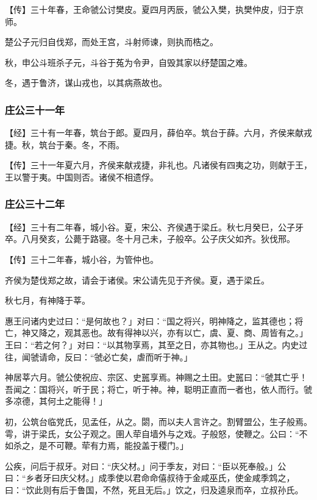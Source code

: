 \documentclass[]{article}
\begin{document}
【传】三十年春，王命虢公讨樊皮。夏四月丙辰，虢公入樊，执樊仲皮，归于京师。

楚公子元归自伐郑，而处王宫，斗射师谏，则执而梏之。

秋，申公斗班杀子元，斗谷于菟为令尹，自毁其家以纾楚国之难。

冬，遇于鲁济，谋山戎也，以其病燕故也。

\hypertarget{header-n594}{%
\subsubsection{庄公三十一年}\label{header-n594}}

【经】三十有一年春，筑台于郎。夏四月，薛伯卒。筑台于薛。六月，齐侯来献戎捷。秋，筑台于秦。冬，不雨。

【传】三十一年夏六月，齐侯来献戎捷，非礼也。凡诸侯有四夷之功，则献于王，王以警于夷。中国则否。诸侯不相遗俘。

\hypertarget{header-n599}{%
\subsubsection{庄公三十二年}\label{header-n599}}

【经】三十有二年春，城小谷。夏，宋公、齐侯遇于梁丘。秋七月癸巳，公子牙卒。八月癸亥，公薨于路寝。冬十月己未，子般卒。公子庆父如齐。狄伐邢。

【传】三十二年春，城小谷，为管仲也。

齐侯为楚伐郑之故，请会于诸侯。宋公请先见于齐侯。夏，遇于梁丘。

秋七月，有神降于莘。

惠王问诸内史过曰：``是何故也？」对曰：``国之将兴，明神降之，监其德也；将亡，神又降之，观其恶也。故有得神以兴，亦有以亡，虞、夏、商、周皆有之。」王曰：``若之何？」对曰：``以其物享焉，其至之日，亦其物也。」王从之。内史过往，闻虢请命，反曰：``虢必亡矣，虐而听于神。」

神居莘六月。虢公使祝应、宗区、史嚚享焉。神赐之土田。史嚚曰：``虢其亡乎！吾闻之：国将兴，听于民；将亡，听于神。神，聪明正直而一者也，依人而行。虢多凉德，其何土之能得！」

初，公筑台临党氏，见孟任，从之。閟，而以夫人言许之。割臂盟公，生子般焉。雩，讲于梁氏，女公子观之。圉人荦自墙外与之戏。子般怒，使鞭之。公曰：``不如杀之，是不可鞭。荦有力焉，能投盖于稷门。」

公疾，问后于叔牙。对曰：``庆父材。」问于季友，对曰：``臣以死奉般。」公曰：``乡者牙曰庆父材。」成季使以君命命僖叔待于金咸巫氏，使金咸季鸩之，曰：``饮此则有后于鲁国，不然，死且无后。」饮之，归及逵泉而卒，立叔孙氏。
\end{document}
